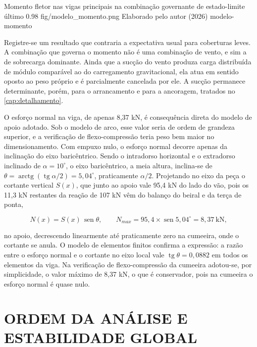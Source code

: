 \figura
{Momento fletor nas vigas principais na combinação governante de estado-limite último}
{0.98}
{fig/modelo_momento.png}
{Elaborado pelo autor (2026)}
{modelo-momento}
{}
{}

Registre-se um resultado que contraria a expectativa usual para coberturas
leves. A combinação que governa o momento não é uma combinação de vento, e sim a
de sobrecarga dominante. Ainda que a sucção do vento produza carga distribuída
de módulo comparável ao do carregamento gravitacional, ela atua em sentido
oposto ao peso próprio e é parcialmente cancelada por ele. A sucção permanece
determinante, porém, para o arrancamento e para a ancoragem, tratados no
\autoref{cap:detalhamento}.

O esforço normal na viga, de apenas 8,37 kN, é consequência direta do modelo de
apoio adotado. Sob o modelo de arco, esse valor seria de ordem de grandeza
superior, e a verificação de flexo-compressão teria peso bem maior no
dimensionamento. Com empuxo nulo, o esforço normal decorre apenas da inclinação
do eixo baricêntrico. Sendo o intradorso horizontal e o extradorso inclinado de
$\alpha = 10^{\circ}$, o eixo baricêntrico, a meia altura, inclina-se de
$\theta = \operatorname{arctg}(\operatorname{tg}\alpha/2) = 5{,}04^{\circ}$,
praticamente $\alpha/2$. Projetando no eixo da peça o cortante vertical $S(x)$, que junto ao apoio vale
95,4 kN do lado do vão, pois os 11,3 kN restantes da reação de 107 kN vêm do
balanço do beiral e da terça de ponta,

\begin{equation}
    N(x) = S(x)\,\operatorname{sen}\theta , \qquad
    N_{max} = 95{,}4 \times \operatorname{sen} 5{,}04^{\circ} = 8{,}37~\text{kN},
    \label{eq:normal-analitico}
\end{equation}

\noindent
no apoio, decrescendo linearmente até praticamente zero na cumeeira, onde o
cortante se anula. O modelo de elementos finitos confirma a expressão: a razão
entre o esforço normal e o cortante no eixo local vale
$\operatorname{tg}\theta = 0{,}0882$ em todos os elementos da viga. Na
verificação de flexo-compressão da cumeeira adotou-se, por simplicidade, o valor
máximo de 8,37 kN, o que é conservador, pois na cumeeira o esforço normal é quase
nulo.

\section{ORDEM DA ANÁLISE E ESTABILIDADE GLOBAL}\label{sec:ordem-analise}


